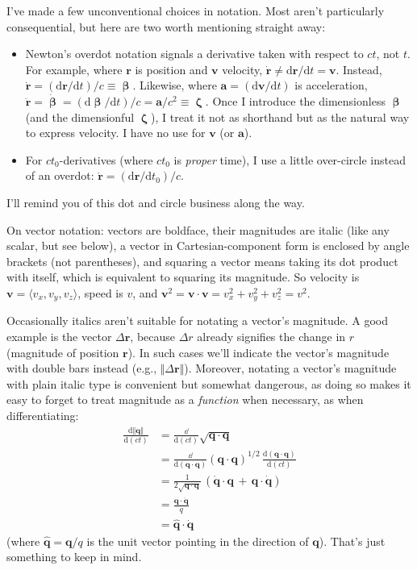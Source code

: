\documentclass[12pt]{article}
\renewcommand{\vv}[1]{\mathbf{#1}}
\newcommand{\dd}[1]{\mathrm{d}#1}
\newcommand{\vvbeta}{\bm{\upbeta}}
\newcommand{\vvzeta}{\bm{\upzeta}}
\begin{document}
I've made a few unconventional choices in notation. Most aren't particularly consequential, but here are two worth mentioning straight away:
\begin{itemize}
\item Newton's overdot notation signals a derivative taken with respect to $ct$, not $t$. For example, where $\vv r$ is position and $\vv v$ velocity, ${\dot{\vv r} \neq \dd \vv r / \dd t = \vv v}$. Instead, $\dot{\vv r} = (\dd \vv r / \dd t)/c \equiv \vvbeta$. Likewise, where $\vv a = (\dd \vv v / \dd t)$ is acceleration, $\ddot{\vv r} = \dot{\vvbeta} = (\dd \vvbeta / \dd t)/c = \vv a / c^2 \equiv \vvzeta$. Once I introduce the dimensionless $\vvbeta$ (and the dimensionful $\vvzeta$), I treat it not as shorthand but as the natural way to express velocity. I have no use for $\vv v$ (or $\vv a$).
\item For $c t_0$-derivatives (where $ct_0$ is \emph{proper} time), I use a little over-circle instead of an overdot: $\mathring{\vv r} = (\dd \vv r / \dd t_0)/c$.
\end{itemize}
I'll remind you of this dot and circle business along the way.

On vector notation: vectors are boldface, their magnitudes are italic (like any scalar, but see below), a vector in Cartesian-component form is enclosed by angle brackets (not parentheses), and squaring a vector means taking its dot product with itself, which is equivalent to squaring its magnitude. So velocity is $\vv v = \langle v_x, v_y, v_z \rangle$, speed is $v$, and $\vv v^2 = \vv v \cdot \vv v = v_x^2 + v_y^2 + v_z^2 = v^2$.

Occasionally italics aren't suitable for notating a vector's magnitude. A good example is the vector $\Delta \vv r$, because $\Delta r$ already signifies the change in $r$ (magnitude of position $\vv r$). In such cases we'll indicate the vector's magnitude with double bars instead (e.g., $\Vert \Delta \vv r \Vert$). Moreover, notating a vector's magnitude with plain italic type is convenient but somewhat dangerous, as doing so makes it easy to forget to treat magnitude as a \emph{function} when necessary, as when differentiating:
\begin{equation*}
\begin{aligned}
\frac{\dd \Vert \vv q \Vert}{\dd (ct)} &= \frac{\dd}{\dd (ct)} \sqrt{ \vv q \cdot \vv q } \\[2pt]
&= \frac{\dd}{\dd (\vv q \cdot \vv q)} \left( \vv q \cdot \vv q \right) ^{1/2} \, \frac{\dd (\vv q \cdot \vv q)}{\dd (ct)} \\[2pt]
&= \frac{1}{2 \sqrt{\vv q \cdot \vv q}} \, \left( \dot{\vv q} \cdot \vv q  \, + \, \vv q \cdot \dot{\vv q} \right) \\[4pt]
&= \frac{\vv q \cdot \dot{\vv q}}{q} \\[4pt]
&= \vv{ \hat q } \cdot \dot{ \vv q }
\end{aligned}
\end{equation*}
(where $\vv{ \hat q } = \vv q / q$ is the unit vector pointing in the direction of $\vv q$). That's just something to keep in mind.
\end{document}
